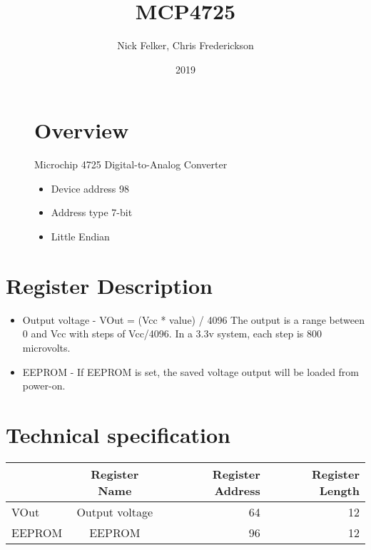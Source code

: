 \documentclass[a4paper,12pt,oneside,pdflatex,italian,final,twocolumn]{article}
\title{ MCP4725 }
\author{ Nick Felker, Chris Frederickson }
\date{ 2019 }
\begin{document}
\pagestyle{fancy}



\onecolumn


\begin{figure}
\begin{minipage}{0.47\textwidth}

\section{Overview}
    Microchip 4725 Digital-to-Analog Converter
    \begin{itemize}
        \item Device address 98
        \item Address type 7-bit
        \item Little Endian
    \end{itemize}


\end{minipage}
\hfill

\end{figure}


\section{Register Description}
\begin{itemize}
\item Output voltage - VOut = (Vcc * value) / 4096
The output is a range between 0 and Vcc with
steps of Vcc/4096.
In a 3.3v system, each step is 800 microvolts.

\item EEPROM - If EEPROM is set, the saved voltage output will
be loaded from power-on.

\end{itemize}

\section{Technical specification}
\centering
\begin{tabular}{lcrr}
\toprule
 & Register Name & Register Address & Register Length \\
\midrule
VOut & Output voltage & 64 & 12 \\
EEPROM & EEPROM & 96 & 12 \\
\bottomrule
\end{tabular}

\raggedright
\end{document}
